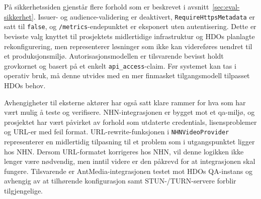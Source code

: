 På sikkerhetssiden gjenstår flere forhold som er beskrevet i avsnitt~\ref{sec:eval-sikkerhet}. Issuer- og audience-validering er deaktivert, \texttt{RequireHttpsMetadata} er satt til \texttt{false}, og \texttt{/metrics}-endepunktet er eksponert uten autentisering. Dette er bevisste valg knyttet til prosjektets midlertidige infrastruktur og HDOs planlagte rekonfigurering, men representerer løsninger som ikke kan videreføres uendret til et produksjonsmiljø. Autorisasjonsmodellen er tilsvarende bevisst holdt grovkornet og basert på et enkelt \texttt{api\_access}-claim. Før systemet kan tas i operativ bruk, må denne utvides med en mer finmasket tilgangsmodell tilpasset HDOs behov.


Avhengigheter til eksterne aktører har også satt klare rammer for hva som har vært mulig å teste og verifisere. NHN-integrasjonen er bygget mot et \gls{qa}-miljø, og prosjektet har vært påvirket av forhold som utdaterte credentials, lisensproblemer og URL-er med feil format. URL-rewrite-funksjonen i \texttt{NHNVideoProvider} representerer en midlertidig tilpasning til et problem som i utgangspunktet ligger hos NHN. Dersom URL-formatet korrigeres hos NHN, vil denne logikken ikke lenger være nødvendig, men inntil videre er den påkrevd for at integrasjonen skal fungere. Tilsvarende er AntMedia-integrasjonen testet mot HDOs QA-instans og avhengig av at tilhørende konfigurasjon samt STUN-/TURN-servere forblir tilgjengelige.


